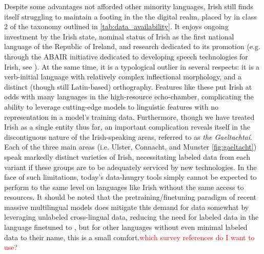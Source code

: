 \documentclass[thesis]{cluu}
\newcommand{\todo}[1]{\textcolor{red}{#1}}
\begin{document}
Despite some advantages not afforded other minority languages, Irish still finds itself struggling to maintain a footing in the the digital realm, placed by \textcite{joshiStateFateLinguistic2021} in class 2 of the taxonomy outlined in \cref{tab:data_availability}. It enjoys ongoing investment by the Irish state, nominal status of Irish as the first national language of the Republic of Ireland, and research dedicated to its promotion (e.g. through the ABAIR initiative dedicated to developing speech technologies for Irish, see \parencite{chasaideABAIRInitiativeBringing2017}). At the same time, it is a typological outlier in several respects: it is a verb-initial language with relatively complex inflectional morphology, and a distinct (though still Latin-based) orthography. Features like these put Irish at odds with many languages in the high-resource echo-chamber, complicating the ability to leverage cutting-edge models to linguistic features with no representation in a model's training data. Furthermore, though we have treated Irish as a single entity thus far, an important complication reveals itself in the discontiguous nature of the Irish-speaking areas, referred to as \textit{the Gaeltachtaí}. Each of the three main areas (i.e. Ulster, Connacht, and Munster \ref{fig:gaeltacht}) speak markedly distinct varieties of Irish, necessitating labeled data from each variant if these groups are to be adequately serviced by new technologies\parencite{nichasaideCanWeDefuse2019}. In the face of such limitations, today's data-hungry tools simply cannot be expected to perform to the same level on languages like Irish without the same access to resources. It should be noted that the pretraining/finetuning paradigm of recent massive multilingual models does mitigate this demand for data somewhat by leveraging unlabeled cross-lingual data, reducing the need for labeled data in the language finetuned to \parencite{hedderichSurveyRecentApproaches2021,ranathungaNeuralMachineTranslation2021,joshiStateFateLinguistic2021}, but for other languages without even minimal labeled data to their name, this is a small comfort.\todo{which survey references do I want to use?}
\end{document}

